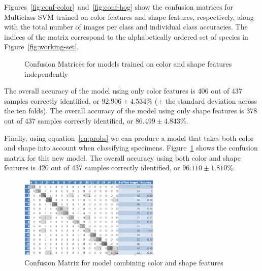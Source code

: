 \documentclass[a4paper,12pt]{article}
\begin{document}
Figures~\ref{fig:conf-color}~and~\ref{fig:conf-hog} show the confusion matrices for Multiclass SVM trained on color features and shape features, respectively, along with the total number of images per class and individual class accuracies. The indices of the matrix correspond to the alphabetically ordered set of species in Figure~\ref{fig:working-set}.

\begin{figure}[h]
	\hfill
	\caption{Confusion Matrices for models trained on color and shape features independently}
\end{figure}

The overall accuracy of the model using only color features is 406 out of 437 samples correctly identified, or $92.906 \pm 4.534 \%$ ($\pm$ the standard deviation across the ten folds). The overall accuracy of the model using only shape features is 378 out of 437 samples correctly identified, or $86.499 \pm 4.843 \%$.

Finally, using equation~\ref{eq:probs} we can produce a model that takes both color and shape into account when classifying specimens. Figure~\ref{fig:conf-both} shows the confusion matrix for this new model. The overall accuracy using both color and shape features is 420 out of 437 samples correctly identified, or $96.110 \pm 1.810 \%$.

\begin{figure}[t]
	\centering
	\includegraphics[width=0.6\textwidth]{confmat/both}
	\caption{Confusion Matrix for model combining color and shape features}
	\label{fig:conf-both}
\end{figure}
\end{document}

